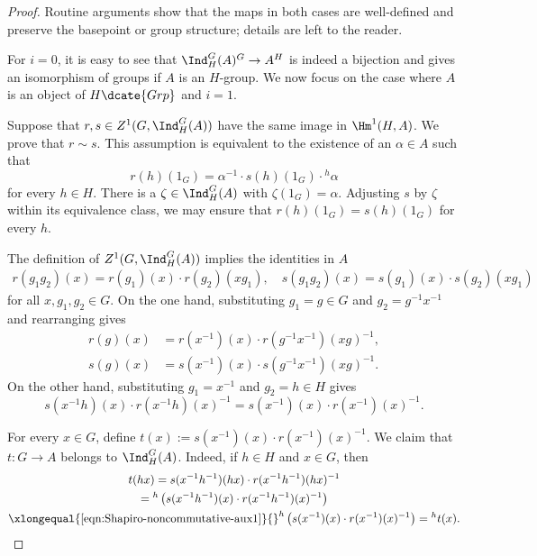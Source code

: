 \begin{proof}
	Routine arguments show that the maps in both cases are well-defined and
	preserve the basepoint or group structure; details are left to the reader.

	For $i=0$, it is easy to see that $\Ind^G_H(A)^G\to A^H$ is indeed a
	bijection and gives an isomorphism of groups if $A$ is an $H$-group. We
	now focus on the case where $A$ is an object of $H\dcate{Grp}$ and
	$i=1$.

	Suppose that $r,s\in Z^1(G,\Ind^G_H(A))$ have the same image in
	$\Hm^1(H,A)$. We prove that $r\sim s$. This assumption is equivalent to
	the existence of an $\alpha\in A$ such that
	\[ r(h)(1_G) = \alpha^{-1} \cdot s(h)(1_G) \cdot {}^h \alpha \]
	for every $h\in H$. There is a $\zeta\in\Ind^G_H(A)$ with
	$\zeta(1_G)=\alpha$. Adjusting $s$ by $\zeta$ within its equivalence
	class, we may ensure that $r(h)(1_G)=s(h)(1_G)$ for every $h$.

	The definition of $Z^1(G,\Ind^G_H(A))$ implies the identities in $A$
	\begin{gather*}
		r(g_1 g_2)(x) =r(g_1)(x) \cdot r(g_2)(xg_1), \quad s(g_1 g_2)(x) = s(g_1)(x) \cdot s(g_2)(xg_1)
	\end{gather*}
	for all $x,g_1,g_2\in G$. On the one hand, substituting $g_1=g\in G$
	and $g_2=g^{-1}x^{-1}$ and rearranging gives
	\begin{equation}\label{eqn:Shapiro-noncommutative-aux0}
		\begin{aligned}
			r(g)(x) & = r(x^{-1})(x) \cdot r(g^{-1} x^{-1})(xg)^{-1}, \\
			s(g)(x) & = s(x^{-1})(x) \cdot s(g^{-1} x^{-1})(xg)^{-1}.
		\end{aligned}
	\end{equation}
	On the other hand, substituting $g_1=x^{-1}$ and $g_2=h\in H$ gives
	\begin{equation}\label{eqn:Shapiro-noncommutative-aux1}
		s(x^{-1} h)(x) \cdot r(x^{-1} h)(x)^{-1} = s(x^{-1})(x) \cdot r(x^{-1})(x)^{-1}.
	\end{equation}

	For every $x\in G$, define
	$t(x):=s(x^{-1})(x)\cdot r(x^{-1})(x)^{-1}$. We claim that
	$t:G\to A$ belongs to $\Ind^G_H(A)$. Indeed, if $h\in H$ and $x\in G$,
	then
	\begin{multline*}
		t(hx) = s(x^{-1} h^{-1})(hx) \cdot r(x^{-1} h^{-1})(hx)^{-1} \\
		= {}^h \left( s(x^{-1}h^{-1})(x) \cdot r(x^{-1} h^{-1})(x)^{-1} \right) \\
		\xlongequal{\text{\eqref{eqn:Shapiro-noncommutative-aux1}}} {}^h \left( s(x^{-1})(x) \cdot r(x^{-1})(x)^{-1} \right) = {}^h t(x).
	\end{multline*}


\end{proof}

